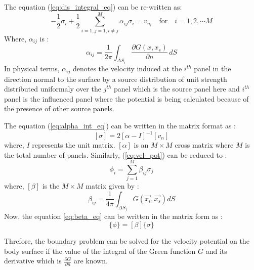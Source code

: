 The equation (\ref{eq:dis_integral_eq}) can be re-written as:
\begin{equation}
    \label{eq:alpha_int_eq}
    -\frac{1}{2}\sigma_i + \frac{1}{2}\sum_{i=1, j=1, i\ne j}^{M}\alpha_{ij}\sigma_i = v_{n_i} \quad \text{for} \quad i = 1, 2, \cdots M
\end{equation}
Where, $\alpha_{ij}$ is : 
\begin{equation}
    \label{eq:alpha}
    \alpha_{ij} = \frac{1}{2\pi}\int_{\Delta S_i}\frac{\partial G(x, x_s)}{\partial n} \,dS
\end{equation}
In physical terms, $\alpha_{ij}$ denotes the velocity induced at the $i^{th}$ panel in the direction normal to the surface by a source distribution of unit strength distributed uniformaly over the $j^{th}$ panel which is the source panel here and $i^{th}$ panel is the influenced panel where the potential is being calculated because of the presence of other source panels.

The equation (\ref{eq:alpha_int_eq}) can be written in the matrix format as :
\begin{equation}
    \label{eq:sigma_alpha}
    [\sigma] = 2[\alpha - I]^{-1}[v_n]
\end{equation}
where, $I$ represents the unit matrix. $[\alpha]$ is an $M\times M$ cross matrix where $M$ is 
the total number of panels. Similarly, (\ref{eq:vel_pot}) can be reduced to : 
\begin{equation}
    \label{eq:beta_eq}
    \phi_i = \sum_{j=1}^{M}\beta_{ij}\sigma_{j}
\end{equation}
where, $[\beta]$ is the $M\times M$ matrix given by :
\begin{equation}
    \label{eq:beta_eq}
    \beta_{ij} = \frac{1}{4\pi}\int_{\Delta S_j}G(\Vec{x_i}, \vec{x_s}) dS  
\end{equation}
Now, the equation \ref{eq:beta_eq} can be written in the matrix form as :
\begin{equation}
    \{\phi\} = [\beta]\{\sigma\}
\end{equation}

Threfore, the boundary problem can be solved for the velocity potential on the body surface 
if the value of the integral of the Green function $G$ and its derivative which is
$\frac{\partial G}{\partial n}$ are known.
